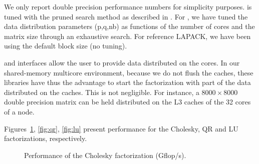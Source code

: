 
We only report double precision performance numbers for simplicity purposes.
\PLASMA is tuned
with the pruned search method as described in \cite{Agullo:2009:CS1}. For
\SCALAPACK, we have tuned the data distribution parameters (p,q,nb) as
functions of the number of cores and the matrix size through an
exhaustive search.  For reference LAPACK, we have been using the
default block size (no tuning).


\SCALAPACK and \PLASMA interfaces allow the user to provide data
distributed on the cores. In our shared-memory multicore environment,
because we do not flush the caches, these libraries have thus the
advantage to start the factorization with part of the data distributed
on the caches. This is not negligible. For instance, a
$8000\times8000$ double precision matrix can be held distributed on
the L3 caches of the 32 cores of a \Power node.


Figures~\ref{fig:ch}, \ref{fig:qr}, \ref{fig:lu} present performance
for the Cholesky, QR and LU factorizations, respectively.

\begin{figure}[htbp]
  \caption{Performance of the Cholesky factorization (Gflop/s).}
  \label{fig:ch}
\end{figure}

